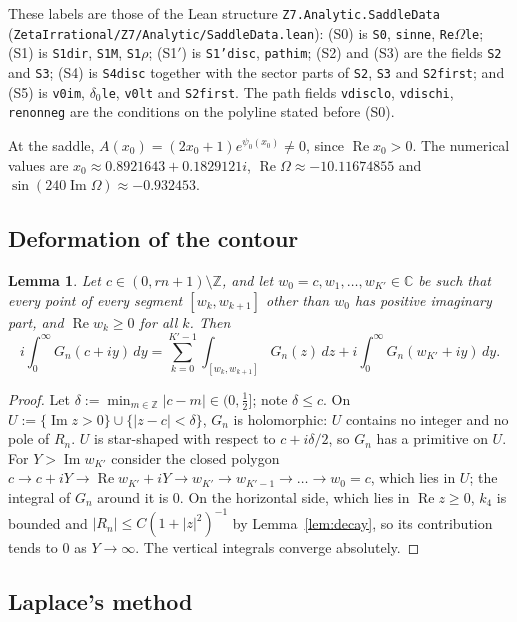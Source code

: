 \documentclass[11pt]{amsart}
\newtheorem{lemma}[theorem]{Lemma}
\theoremstyle{definition}
\theoremstyle{remark}
\numberwithin{equation}{section}
\newcommand{\ZZ}{\mathbb{Z}}
\newcommand{\CC}{\mathbb{C}}
\renewcommand{\Re}{\operatorname{Re}}
\renewcommand{\Im}{\operatorname{Im}}
\newcommand{\lean}[1]{{\def\_{\textunderscore\allowbreak}\texttt{#1}}}
\begin{document}
These labels are those of the Lean structure \lean{Z7.Analytic.SaddleData}
(\lean{ZetaIrrational\slash{}Z7\slash{}Analytic\slash{}SaddleData.lean}): (S0) is \lean{S0}, \lean{sin\_ne},
\lean{Re$\Omega$\_le}; (S1) is \lean{S1\_dir}, \lean{S1\_M}, \lean{S1\_$\rho$}; (S1$'$) is \lean{S1'\_disc},
\lean{path\_im}; (S2) and (S3) are the fields \lean{S2} and \lean{S3}; (S4) is \lean{S4\_disc} together with the
sector parts of \lean{S2}, \lean{S3} and \lean{S2\_first}; and (S5) is \lean{v0\_im}, \lean{$\delta_0$\_le},
\lean{v0\_lt} and
\lean{S2\_first}. The path fields \lean{v\_disc\_lo}, \lean{v\_disc\_hi}, \lean{re\_nonneg} are the conditions on
the polyline stated before (S0).

At the saddle, $A(x_0)=(2x_0+1)e^{\psi_0(x_0)}\ne0$, since $\Re x_0>0$. The numerical values are
$x_0\approx0.8921643+0.1829121i$, $\Re\Omega\approx-10.11674855$ and $\sin(240\Im\Omega)\approx-0.932453$.

\subsection{Deformation of the contour}

\begin{lemma}\label{lem:deform}
Let $c\in(0,rn+1)\setminus\ZZ$, and let $w_0=c,w_1,\dots,w_{K'}\in\CC$ be such that every point of every segment
$[w_k,w_{k+1}]$ other than $w_0$ has positive imaginary part, and $\Re w_k\ge0$ for all $k$. Then
\[
  i\int_0^\infty G_n(c+iy)\,dy=\sum_{k=0}^{K'-1}\int_{[w_k,w_{k+1}]}G_n(z)\,dz+i\int_0^\infty G_n(w_{K'}+iy)\,dy .
\]
\end{lemma}

\begin{proof}
Let $\delta:=\min_{m\in\ZZ}|c-m|\in(0,\frac12]$; note $\delta\le c$. On $U:=\{\Im z>0\}\cup\{|z-c|<\delta\}$, $G_n$ is
holomorphic: $U$ contains no integer and no pole of $R_n$. $U$ is star-shaped with respect to $c+i\delta/2$, so
$G_n$ has a primitive on $U$. For $Y>\Im w_{K'}$ consider the closed polygon
$c\to c+iY\to\Re w_{K'}+iY\to w_{K'}\to w_{K'-1}\to\dots\to w_0=c$, which lies in $U$; the integral of $G_n$ around it
is $0$. On the horizontal side, which lies in $\Re z\ge0$, $k_4$ is bounded and $|R_n|\le C(1+|z|^2)^{-1}$ by
Lemma~\ref{lem:decay}, so its contribution tends to $0$ as $Y\to\infty$. The vertical integrals converge absolutely.
\end{proof}

\subsection{Laplace's method}
\end{document}
